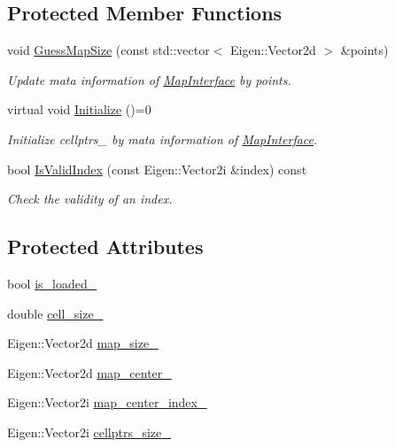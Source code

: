 \subsection*{Protected Member Functions}
\begin{DoxyCompactItemize}
\item 
void \hyperlink{classMapInterface_a37aaa1fd2a400cb1138100eeae9b566b}{Guess\+Map\+Size} (const std\+::vector$<$ Eigen\+::\+Vector2d $>$ \&points)
\begin{DoxyCompactList}\small\item\em Update mata information of \hyperlink{classMapInterface}{Map\+Interface} by points. \end{DoxyCompactList}\item 
virtual void \hyperlink{classMapInterface_a0bb41a6f4ca6e146b7c8a0e99e888169}{Initialize} ()=0
\begin{DoxyCompactList}\small\item\em Initialize {\ttfamily cellptrs\+\_\+} by mata information of \hyperlink{classMapInterface}{Map\+Interface}. \end{DoxyCompactList}\item 
bool \hyperlink{classMapInterface_a19f763b424405f5da2863660c5f0ccb3}{Is\+Valid\+Index} (const Eigen\+::\+Vector2i \&index) const
\begin{DoxyCompactList}\small\item\em Check the validity of an index. \end{DoxyCompactList}\end{DoxyCompactItemize}
\subsection*{Protected Attributes}
\begin{DoxyCompactItemize}
\item 
bool \hyperlink{classMapInterface_a9f323066b687763076c9fdca1e370e2a}{is\+\_\+loaded\+\_\+}
\item 
double \hyperlink{classMapInterface_a67c2db325b44e03954d845b5d626daf6}{cell\+\_\+size\+\_\+}
\item 
Eigen\+::\+Vector2d \hyperlink{classMapInterface_a83368917e03aaea6b1bcc4f8217426ef}{map\+\_\+size\+\_\+}
\item 
Eigen\+::\+Vector2d \hyperlink{classMapInterface_a4a93205a5de9eb328fae48138c0cbb4c}{map\+\_\+center\+\_\+}
\item 
Eigen\+::\+Vector2i \hyperlink{classMapInterface_acbc97db0c3d7bd68b143d1a933a87439}{map\+\_\+center\+\_\+index\+\_\+}
\item 
Eigen\+::\+Vector2i \hyperlink{classMapInterface_ae7400134de8e386c99823aa24f25c799}{cellptrs\+\_\+size\+\_\+}
\end{DoxyCompactItemize}


